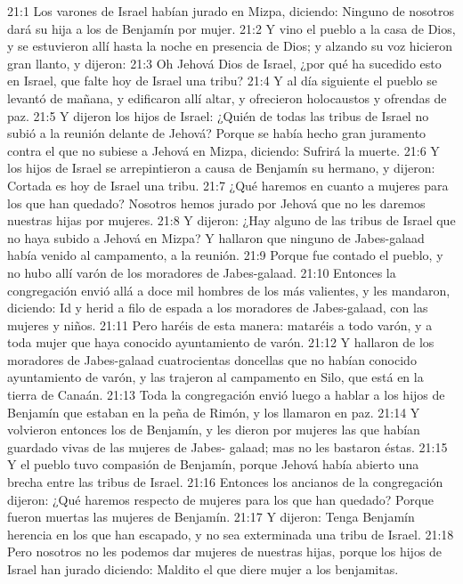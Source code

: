 21:1 Los varones de Israel habían jurado en Mizpa, diciendo: Ninguno de nosotros dará su hija a los de Benjamín por mujer.  
21:2 Y vino el pueblo a la casa de Dios, y se estuvieron allí hasta la noche en presencia de Dios; y alzando su voz hicieron gran llanto, y dijeron:  
21:3 Oh Jehová Dios de Israel, ¿por qué ha sucedido esto en Israel, que falte hoy de Israel una tribu?  
21:4 Y al día siguiente el pueblo se levantó de mañana, y edificaron allí altar, y ofrecieron holocaustos y ofrendas de paz.  
21:5 Y dijeron los hijos de Israel: ¿Quién de todas las tribus de Israel no subió a la reunión delante de Jehová? Porque se había hecho gran juramento contra el que no subiese a Jehová en Mizpa, diciendo: Sufrirá la muerte.  
21:6 Y los hijos de Israel se arrepintieron a causa de Benjamín su hermano, y dijeron: Cortada es hoy de Israel una tribu.  
21:7 ¿Qué haremos en cuanto a mujeres para los que han quedado? Nosotros hemos jurado por Jehová que no les daremos nuestras hijas por mujeres.  
21:8 Y dijeron: ¿Hay alguno de las tribus de Israel que no haya subido a Jehová en Mizpa? Y hallaron que ninguno de Jabes-galaad había venido al campamento, a la reunión.  
21:9 Porque fue contado el pueblo, y no hubo allí varón de los moradores de Jabes-galaad. 
21:10 Entonces la congregación envió allá a doce mil hombres de los más valientes, y les mandaron, diciendo: Id y herid a filo de espada a los moradores de Jabes-galaad, con las mujeres y niños.  
21:11 Pero haréis de esta manera: mataréis a todo varón, y a toda mujer que haya conocido ayuntamiento de varón.  
21:12 Y hallaron de los moradores de Jabes-galaad cuatrocientas doncellas que no habían conocido ayuntamiento de varón, y las trajeron al campamento en Silo, que está en la tierra de Canaán.  
21:13 Toda la congregación envió luego a hablar a los hijos de Benjamín que estaban en la peña de Rimón, y los llamaron en paz.  
21:14 Y volvieron entonces los de Benjamín, y les dieron por mujeres las que habían guardado vivas de las mujeres de Jabes- galaad; mas no les bastaron éstas.  
21:15 Y el pueblo tuvo compasión de Benjamín, porque Jehová había abierto una brecha entre las tribus de Israel.  
21:16 Entonces los ancianos de la congregación dijeron: ¿Qué haremos respecto de mujeres para los que han quedado? Porque fueron muertas las mujeres de Benjamín.  
21:17 Y dijeron: Tenga Benjamín herencia en los que han escapado, y no sea exterminada una tribu de Israel.  
21:18 Pero nosotros no les podemos dar mujeres de nuestras hijas, porque los hijos de Israel han jurado diciendo: Maldito el que diere mujer a los benjamitas. 
